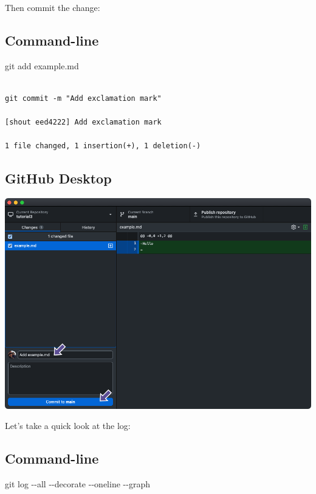 \documentclass[
  letterpaper,
  DIV=11,
  numbers=noendperiod]{scrartcl}
\newenvironment{Shaded}{\begin{snugshade}}{\end{snugshade}}
\newcommand{\AttributeTok}[1]{\textcolor[rgb]{0.40,0.45,0.13}{#1}}
\newcommand{\FunctionTok}[1]{\textcolor[rgb]{0.28,0.35,0.67}{#1}}
\newcommand{\NormalTok}[1]{\textcolor[rgb]{0.00,0.23,0.31}{#1}}
\begin{document}
Then commit the change:

\subsection{Command-line}

\begin{Shaded}
\begin{Highlighting}[]
\FunctionTok{git}\NormalTok{ add example.md}
\end{Highlighting}
\end{Shaded}

\begin{verbatim}

git commit -m "Add exclamation mark"

[shout eed4222] Add exclamation mark

1 file changed, 1 insertion(+), 1 deletion(-)
\end{verbatim}

\subsection{GitHub Desktop}

\includegraphics{images/image30.png}

Let's take a quick look at the log:

\subsection{Command-line}

\begin{Shaded}
\begin{Highlighting}[]
\FunctionTok{git}\NormalTok{ log }\AttributeTok{{-}{-}all} \AttributeTok{{-}{-}decorate} \AttributeTok{{-}{-}oneline} \AttributeTok{{-}{-}graph}
\end{Highlighting}
\end{Shaded}
\end{document}
